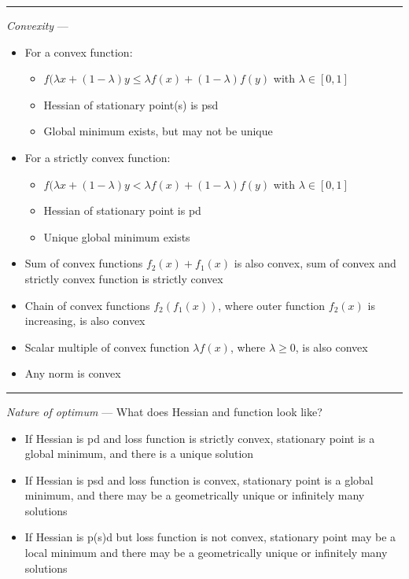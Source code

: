 {\color{lightgray}\hrule height 0.001mm}

\emph{Convexity} --- 
\begin{itemize}
    \item For a convex function: 
    \begin{itemize}
        \item $f(\lambda x + (1-\lambda)y \leq \lambda f(x) + (1-\lambda) f(y)$ with $\lambda \in [0,1]$
        \item Hessian of stationary point(s) is psd
        \item Global minimum exists, but may not be unique
    \end{itemize}
    \item For a strictly convex function:
    \begin{itemize}
        \item $f(\lambda x + (1-\lambda)y < \lambda f(x) + (1-\lambda) f(y)$ with $\lambda \in [0,1]$
        \item Hessian of stationary point is pd
        \item Unique global minimum exists 
    \end{itemize}
    \item Sum of convex functions $f_2(x) + f_1(x)$ is also convex, sum of convex and strictly convex function is strictly convex
    \item Chain of convex functions $f_2(f_1(x))$, where outer function $f_2(x)$ is increasing, is also convex
    \item Scalar multiple of convex function $\lambda f(x)$, where $\lambda \geq 0$, is also convex
    \item Any norm is convex
\end{itemize}

{\color{lightgray}\hrule height 0.001mm}

\emph{Nature of optimum} --- 
What does Hessian and function look like?
\begin{itemize}
    \item If Hessian is pd and loss function is strictly convex, stationary point is a global minimum, and there is a unique solution
    \item If Hessian is psd and loss function is convex, stationary point is a global minimum, and there may be a geometrically unique or infinitely many solutions
    \item If Hessian is p(s)d but loss function is not convex, stationary point may be a local minimum and there may be a geometrically unique or infinitely many solutions
\end{itemize}

